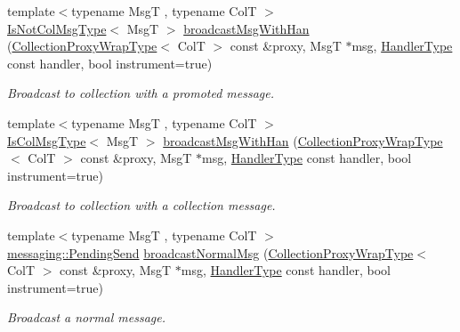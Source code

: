 \begin{DoxyCompactItemize}
{\footnotesize template$<$typename MsgT , typename ColT $>$ }\\\hyperlink{structvt_1_1vrt_1_1collection_1_1_collection_manager_ae376deeefd4f89a0b1c93849977715d9}{Is\+Not\+Col\+Msg\+Type}$<$ MsgT $>$ \hyperlink{structvt_1_1vrt_1_1collection_1_1_collection_manager_a3b84dab30f231cc9a266ff323340f17e}{broadcast\+Msg\+With\+Han} (\hyperlink{structvt_1_1vrt_1_1collection_1_1_collection_manager_a56458ed7f9bb22b631b9b3a745f42f94}{Collection\+Proxy\+Wrap\+Type}$<$ ColT $>$ const \&proxy, MsgT $\ast$msg, \hyperlink{namespacevt_af64846b57dfcaf104da3ef6967917573}{Handler\+Type} const handler, bool instrument=true)
\begin{DoxyCompactList}\small\item\em Broadcast to collection with a promoted message. \end{DoxyCompactList}\item 
{\footnotesize template$<$typename MsgT , typename ColT $>$ }\\\hyperlink{structvt_1_1vrt_1_1collection_1_1_collection_manager_a21c21612c806016788057aeab142af20}{Is\+Col\+Msg\+Type}$<$ MsgT $>$ \hyperlink{structvt_1_1vrt_1_1collection_1_1_collection_manager_a17e6a23d781779e9d0e4fe068f73ac90}{broadcast\+Msg\+With\+Han} (\hyperlink{structvt_1_1vrt_1_1collection_1_1_collection_manager_a56458ed7f9bb22b631b9b3a745f42f94}{Collection\+Proxy\+Wrap\+Type}$<$ ColT $>$ const \&proxy, MsgT $\ast$msg, \hyperlink{namespacevt_af64846b57dfcaf104da3ef6967917573}{Handler\+Type} const handler, bool instrument=true)
\begin{DoxyCompactList}\small\item\em Broadcast to collection with a collection message. \end{DoxyCompactList}\item 
{\footnotesize template$<$typename MsgT , typename ColT $>$ }\\\hyperlink{structvt_1_1messaging_1_1_pending_send}{messaging\+::\+Pending\+Send} \hyperlink{structvt_1_1vrt_1_1collection_1_1_collection_manager_aa10f6bc4c1b886b78b22e0c9ca3805ef}{broadcast\+Normal\+Msg} (\hyperlink{structvt_1_1vrt_1_1collection_1_1_collection_manager_a56458ed7f9bb22b631b9b3a745f42f94}{Collection\+Proxy\+Wrap\+Type}$<$ ColT $>$ const \&proxy, MsgT $\ast$msg, \hyperlink{namespacevt_af64846b57dfcaf104da3ef6967917573}{Handler\+Type} const handler, bool instrument=true)
\begin{DoxyCompactList}\small\item\em Broadcast a normal message. \end{DoxyCompactList}\item 

\end{DoxyCompactItemize}
